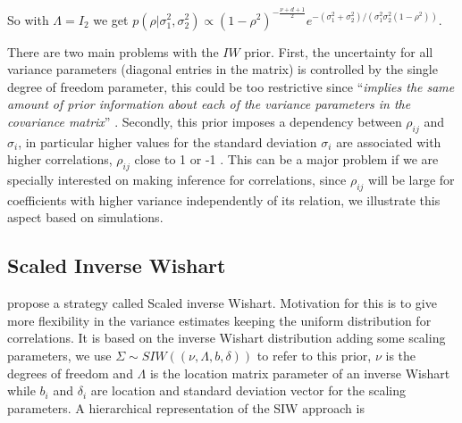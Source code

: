 \documentclass{article}
\begin{document}
So with $\Lambda = I_2$ we get $p(\rho \vert \sigma_1^2,\sigma_2^2) \propto  (1-\rho^2)^{-\frac{\nu+d+1}{2}}e^{-(\sigma_1^2+\sigma_2^2)/(\sigma_1^2 \sigma_2^2(1-\rho^2))}$. 
 
There are two main problems with the $IW$ prior. 
First, the uncertainty for all variance parameters (diagonal entries in the matrix) is controlled by the single degree of freedom parameter, this could  be too restrictive since ``\textit{implies the same amount of prior information about each of the variance parameters in the covariance matrix}'' \citep{bda2003}. Secondly, this prior imposes a dependency between $\rho_{ij}$ and $\sigma_i$, in particular higher values for the standard deviation $\sigma_i$ are associated with higher correlations, $\rho_{ij}$ close to 1 or -1 \citep{visualize}.  This can be a major problem if we are specially interested on making inference for correlations, since $\rho_{ij}$ will be large for coefficients with higher variance independently of its relation,  we illustrate this aspect based on simulations. 

 
\subsection{Scaled Inverse Wishart}
\cite{odomain} propose a strategy called Scaled inverse Wishart. Motivation for this is to give more flexibility in the variance estimates keeping the uniform distribution for correlations. It is based on the inverse Wishart distribution adding some scaling parameters, we use $\Sigma \sim SIW((\nu, \Lambda, b, \delta))$ to refer to this prior, $\nu$ is the degrees of freedom and $\Lambda$ is the location matrix parameter of an inverse Wishart while $b_i$ and $\delta_i$ are location and standard deviation vector for the scaling parameters. A hierarchical representation of the SIW approach is  
\end{document}
